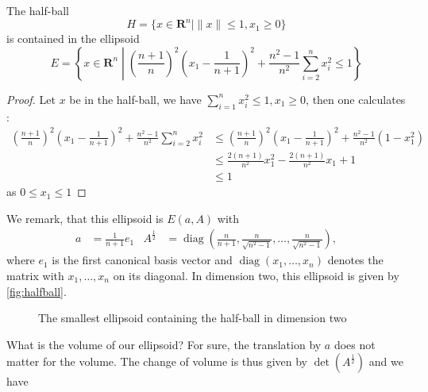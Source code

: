 \documentclass[10pt]{article}
\newcommand{\R}{\mathbf{R}}
\newcommand{\diag}{\operatorname{diag}}
\begin{document}
\begin{lemma}\label{lem:halfball}
The half-ball
\[
H = \{x \in \R^n | \| x \| \le 1, x_1 \ge 0 \}
\]
is contained in the ellipsoid
\[
E = \left\{ x \in \R^n \middle| \left(\frac{n+1}{n}\right)^2\left(x_1 - \frac{1}{n+1}\right)^2 + \frac{n^2-1}{n^2} \sum_{i=2}^n x_i^2 \le 1 \right\}
\]
\end{lemma}
\begin{proof}
Let $x$ be in the half-ball, we have $\sum_{i=1}^n x_i^2 \le 1, x_1 \ge 0$, then one calculates :
\begin{align*}
\left(\frac{n+1}{n} \right)^2 \left(x_1-\frac{1}{n+1}\right)^2 + \frac{n^2-1}{n^2} \sum_{i=2}^n x_i^2 
&\leq \left(\frac{n+1}{n} \right)^2 \left(x_1-\frac{1}{n+1}\right)^2 + \frac{n^2-1}{n^2}(1 - x_1^2)\\
&\leq \frac{2(n+1)}{n^2} x_1^2-\frac{2(n+1)}{n^2}x_1 + 1\\
&\leq 1 
\end{align*}
as  $0 \leq x_1 \leq 1$
\end{proof}
We remark, that this ellipsoid is $E(a,A)$ with
\begin{align*}
a &= \frac{1}{n+1} e_1 &  A^{\frac{1}{2}}&= \diag \left(\frac{n}{n+1}, \frac{n}{\sqrt{n^2-1}}, \dots, \frac{n}{\sqrt{n^2-1}}\right),
\end{align*}
where $e_1$ is the first canonical basis vector and $\diag (x_1, \dots, x_n)$ denotes the matrix with $x_1, \dots, x_n$ on its diagonal. In dimension two, this ellipsoid is given by \autoref{fig:halfball}.
\begin{figure}
\centering
{}
\caption{The smallest ellipsoid containing the half-ball in dimension two}
\label{fig:halfball}
\end{figure}
What is the volume of our ellipsoid? For sure, the translation by $a$ does not matter for the volume. The change of volume is thus given by $\det (A^{\frac{1}{2}})$ and we have
\end{document}
